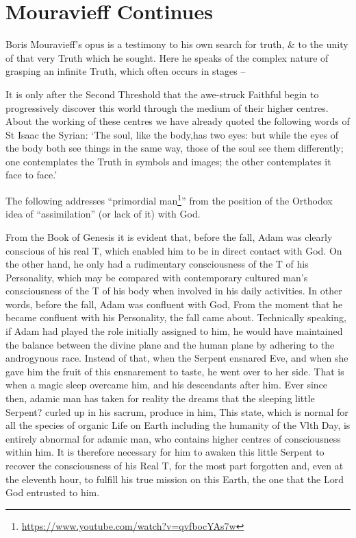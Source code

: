 \section{Mouravieff Continues}

Boris Mouravieff's opus is a testimony to his own search for truth, \& to the unity of that very Truth which he sought. Here he speaks of the complex nature of grasping an infinite Truth, which often occurs in stages --

\begin{quotex}
It is only after the Second Threshold that the awe-struck Faithful begin to progressively discover this world through the medium of their higher centres. About the working of these centres we have already quoted the following words of St Isaac the Syrian: `The soul, like the body,has two eyes: but while the eyes of the body both see things in the same way, those of the soul see them differently; one contemplates the Truth in symbols and images; the other contemplates it face to face.'
\end{quotex}


The following addresses ``primordial man\footnote{\url{https://www.youtube.com/watch?v=qvfbocYAs7w}}'' from the position of the Orthodox idea of ``assimilation'' (or lack of it) with God.

\begin{quotex}
From the Book of Genesis it is evident that, before the fall, Adam was clearly conscious of his real T, which enabled him to be in direct contact with God. On the other hand, he only had a rudimentary consciousness of the T of his Personality, which may be compared with contemporary cultured man's consciousness of the T of his body when involved in his daily activities. In other words, before the fall, Adam was confluent with God, From the moment that he became confluent with his Personality, the fall came about. Technically speaking, if Adam had played the role initially assigned to him, he would have maintained the balance between the divine plane and the human plane by adhering to the androgynous race. Instead of that, when the Serpent ensnared Eve, and when she gave him the fruit of this ensnarement to taste, he went over to her side. That is when a magic sleep overcame him, and his descendants after him. Ever since then, adamic man has taken for reality the dreams that the sleeping little Serpent? curled up in his sacrum, produce in him, This state, which is normal for all the species of organic Life on Earth including the humanity of the Vlth Day, is entirely abnormal for adamic man, who contains higher centres of consciousness within him. It is therefore necessary for him to awaken this little Serpent to recover the consciousness of his Real T, for the most part forgotten and, even at the eleventh hour, to fulfill his true mission on this Earth, the one that the Lord God entrusted to him.
\end{quotex}


